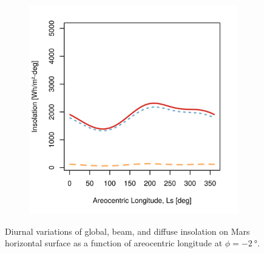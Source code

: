 \begin{figure}[h]
\begin{subfigure}[t]{\subfigureWidth}
  		\label{fig:sub:insolation-ls-tau-factor-2}
  	\end{subfigure}\hfill
	   \begin{subfigure}[t]{\subfigureWidth}
      \centering
  		\includegraphics[height=\graphicsHeight]{sections/mars-solar-energy/solar-radiation/plots/hh-hbh-and-hdh-as-a-function-of-ls-for-tau3-phi2-and-albedo-027}
  		\label{fig:sub:insolation-ls-tau-factor-3}
	   \end{subfigure}\hfill
	\caption[Insolation variations]
    {Diurnal variations of global, beam, and diffuse insolation on Mars horizontal surface as a function of areocentric longitude at $\phi = \SI{-2}{\degree}$.}
	\label{fig:plot:insolation-ls}
\vspace{-2ex}
\end{figure}

